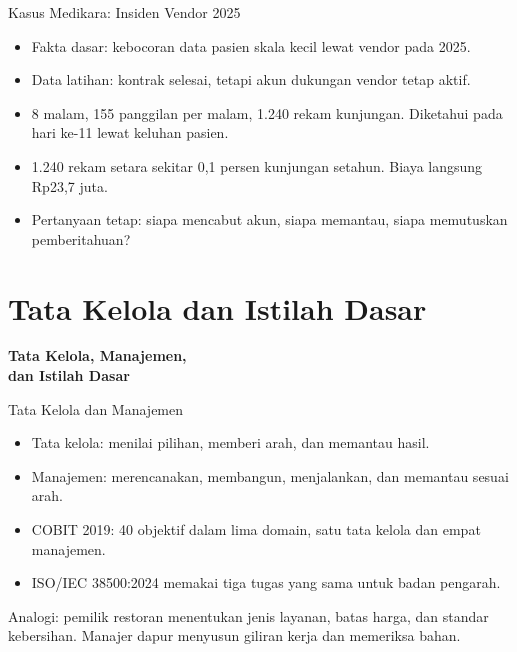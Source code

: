 \documentclass[aspectratio=169, table, 12pt]{beamer}
\begin{document}
\begin{frame}{{\Large Kasus Medikara: Insiden Vendor 2025}}
  \vspace{4pt}
  \small
  \begin{itemize}
    \item Fakta dasar: kebocoran data pasien skala kecil lewat vendor pada 2025.
    \item Data latihan: kontrak selesai, tetapi akun dukungan vendor tetap aktif.
    \item 8 malam, 155 panggilan per malam, 1.240 rekam kunjungan. Diketahui pada hari ke-11
          lewat keluhan pasien.
    \item 1.240 rekam setara sekitar 0,1 persen kunjungan setahun. Biaya langsung Rp23,7 juta.
    \item Pertanyaan tetap: siapa mencabut akun, siapa memantau, siapa memutuskan pemberitahuan?
  \end{itemize}
\end{frame}

\section{Tata Kelola dan Istilah Dasar}

\begin{frame}{\hfill}
  \centering
  \Huge{\textbf{Tata Kelola, Manajemen,\\dan Istilah Dasar}}
\end{frame}

\begin{frame}{{\Large Tata Kelola dan Manajemen}}
  \vspace{4pt}
  \small
  \begin{itemize}
    \item Tata kelola: menilai pilihan, memberi arah, dan memantau hasil.
    \item Manajemen: merencanakan, membangun, menjalankan, dan memantau sesuai arah.
    \item COBIT 2019: 40 objektif dalam lima domain, satu tata kelola dan empat manajemen.
    \item ISO/IEC 38500:2024 memakai tiga tugas yang sama untuk badan pengarah.
  \end{itemize}
  \vspace{6pt}
  {\footnotesize Analogi: pemilik restoran menentukan jenis layanan, batas harga, dan standar
  kebersihan. Manajer dapur menyusun giliran kerja dan memeriksa bahan.}
\end{frame}
\end{document}
